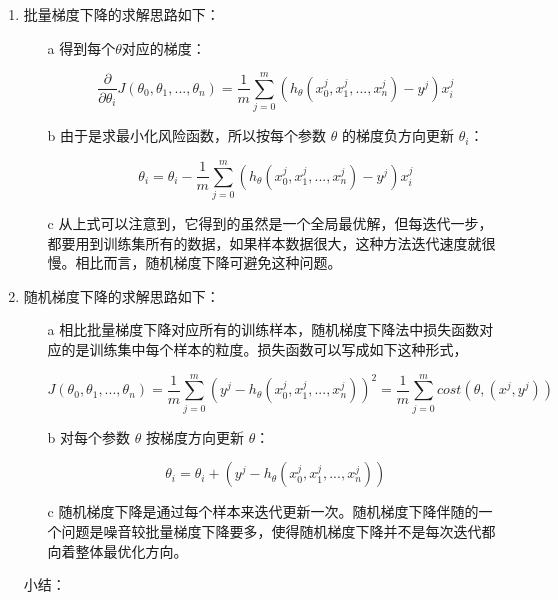 \begin{enumerate}
	\itemsep0em 

	\item 批量梯度下降的求解思路如下：

		\begin{enumerate}
			\itemsep0em 
			\item[a] 得到每个$ \theta $对应的梯度：

				$$
				\frac{\partial}{\partial \theta_i}J({\theta}_0,{\theta}_1,...,{\theta}_n)=\frac{1}{m}\sum^{m}_{j=0}(h_\theta (x^{j}_0 ,x^{j}_1,...,x^{j}_n)-y^j)x^{j}_i
				$$

			\item[b] 由于是求最小化风险函数，所以按每个参数 $ \theta $ 的梯度负方向更新 $ \theta_i $：

				$$
				\theta_i=\theta_i - \frac{1}{m} \sum^{m}_{j=0}(h_\theta (x^{j}_0,x^{j}_1,...,x^{j}_n)-y^j)x^{j}_i
				$$

			\item[c] 从上式可以注意到，它得到的虽然是一个全局最优解，但每迭代一步，都要用到训练集所有的数据，如果样本数据很大，这种方法迭代速度就很慢。相比而言，随机梯度下降可避免这种问题。
		\end{enumerate}

	\item 随机梯度下降的求解思路如下：

		\begin{enumerate}
			\itemsep0em 

			\item[a] 相比批量梯度下降对应所有的训练样本，随机梯度下降法中损失函数对应的是训练集中每个样本的粒度。损失函数可以写成如下这种形式，

				$$
				J(\theta_0, \theta_1, ... , \theta_n) = 
				\frac{1}{m} \sum^{m}_{j=0}(y^j - h_\theta (x^{j}_0
				,x^{j}_1,...,x^{j}_n))^2 = 
				\frac{1}{m} \sum^{m}_{j=0} cost(\theta,(x^j,y^j))
				$$

			\item[b] 对每个参数 $ \theta$ 按梯度方向更新 $ \theta$：

				$$
				\theta_i = \theta_i + (y^j - h_\theta (x^{j}_0, x^{j}_1, ... ,x^{j}_n))
				$$

			\item[c] 随机梯度下降是通过每个样本来迭代更新一次。随机梯度下降伴随的一个问题是噪音较批量梯度下降要多，使得随机梯度下降并不是每次迭代都向着整体最优化方向。

		\end{enumerate} 

		小结：


\end{enumerate}
